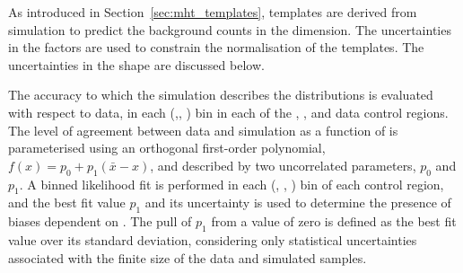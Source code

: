 


As introduced in Section~\ref{sec:mht_templates}, templates are
derived from simulation to predict the background counts in the
\HTmiss dimension. The uncertainties in the \tf factors are used
to constrain the normalisation of the \HTmiss templates. The
uncertainties in the \HTmiss shape are discussed below.


The accuracy to which the simulation describes the \HTmiss distributions
is evaluated with respect to data, in each (\njet,\nb, \scalht) bin in
each of the \mj, \mmj, and \gj data control regions. %
The level of agreement between data and simulation as a function of
\HTmiss is parameterised using an orthogonal first-order polynomial,
$f(x) = p_0 + p_1(\bar{x}-x)$, and described by two uncorrelated
parameters, $p_0$ and $p_1$. A binned likelihood fit is performed in
each (\njet, \nb, \scalht) bin of each control region, and the best
fit value $p_1$ and its uncertainty is used to determine the presence
of biases dependent on \HTmiss. The pull of $p_1$ from a value of zero
is defined as the best fit value over its standard deviation,
considering only statistical uncertainties associated with the finite
size of the data and simulated samples.

